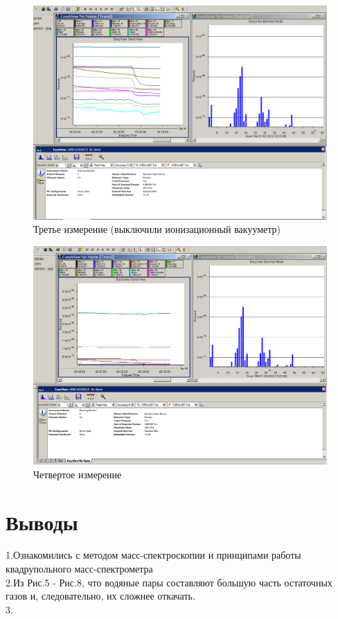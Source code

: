 \documentclass[a4paper,12pt]{article}
\begin{document}
\begin{figure}[h!]
	\begin{center}
	\includegraphics[scale=0.4]{graph7}
	\caption{Третье измерение (выключили ионизационный вакууметр)}
	\end{center}
\end{figure}

\newpage

\begin{figure}[h!]
	\begin{center}
	\includegraphics[scale=0.4]{graph8}
	\caption{Четвертое измерение}
	\end{center}
\end{figure}


\section*{Выводы}

1.Ознакомились с методом масс-спектроскопии и принципами работы квадрупольного масс-спектрометра \\
2.Из Рис.5 - Рис.8, что водяные пары составляют б$\acute{о}$льшую часть остаточных газов и, следовательно, их сложнее откачать. \\
3.
\end{document}
